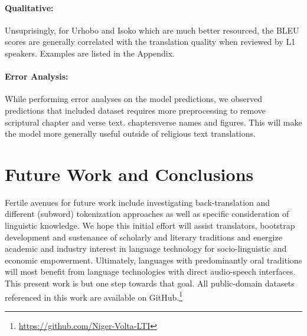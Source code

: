 \documentclass{article} %
\begin{document}
\paragraph{Qualitative:} Unsuprisingly, for Urhobo and Isoko which are much better resourced, the BLEU scores are generally correlated with the translation quality when reviewed by L1 speakers. Examples are listed in the Appendix.

\paragraph{Error Analysis:} While performing error analyses on the model predictions, we observed predictions that included  dataset requires more preprocessing to remove scriptural chapter and verse text.  chapters\/verse names and figures. This will make the model more generally useful outside of religious text translations.

\section{Future Work and Conclusions}
Fertile avenues for future work include investigating back-translation and different (subword) tokenization approaches as well as specific consideration of linguistic knowledge. We hope this initial effort will assist translators, bootstrap development and sustenance of scholarly and literary traditions and energize academic and industry interest in language technology for socio-linguistic and economic empowerment. Ultimately, languages with predominantly oral traditions will most benefit from language technologies with direct audio-speech interfaces. This present work is but one step towards that goal. All public-domain datasets referenced in this work are available on GitHub.\footnote{\url{https://github.com/Niger-Volta-LTI}}
 
% 
\end{document}
